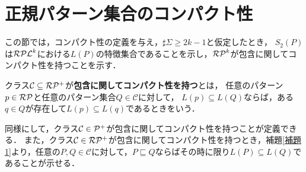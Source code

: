 \section{正規パターン集合のコンパクト性}

この節では，コンパクト性の定義を与え，$\sharp\Sigma \ge 2k-1$と仮定したとき，
$S_{2}(P)$は$\mathcal{RPL}^{k}$における$L(P)$の特徴集合であることを示し，$\mathcal{RP}^{k}$が包含に関してコンパクト性を持つことを示す．

\begin{dfn}
クラス$\mathcal{C} \subseteq \mathcal{RP^{+}}$が\textbf{包含に関してコンパクト性を持つ}とは，
任意のパターン$p \in \mathcal{RP}$と任意のパターン集合$Q \in \mathcal{C}$に対して，
$L(p) \subseteq L(Q)$ならば，ある$q \in Q$が存在して$L(p) \subseteq L(q)$であるときをいう．
\end{dfn}
同様にして，クラス$\mathcal{C} \in \mathcal{P^{+}}$が包含に関してコンパクト性を持つことが定義できる．
また，クラス$\mathcal{C} \in \mathcal{RP^{+}}$が包含に関してコンパクト性を持つとき，補題\ref{補題1}より，任意の$P, Q \in \mathcal{C}$に対して，$P \sqsubseteq Q$ならばその時に限り$L(P) \subseteq L(Q)$であることが示せる．

